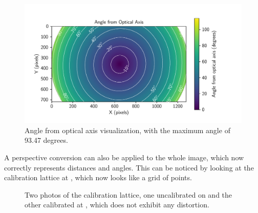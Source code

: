 \begin{figure}[H]
	\centering
	\includegraphics[width=1.0\textwidth]{./fig/pgfplot/build/evk4_viz.pdf}
	\caption{Angle from optical axis visualization, with the maximum angle of 93.47 degrees.}
	\label{fig:calibration_viz}
\end{figure}

A perspective conversion can also be applied to the whole image, which now correctly represents distances and angles. This can be noticed by looking
at the calibration lattice at , which now looks like a grid of points.

\begin{figure}[H]
	\centering
	\caption{
		Two photos of the calibration lattice, one uncalibrated on  and the other calibrated at , which does not
		exhibit any distortion.
  }
	\label{fig:calib_c}
\end{figure}

